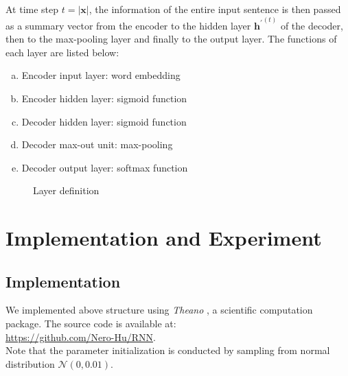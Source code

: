 \documentclass[11pt,letterpaper]{article}
\begin{document}
At time step $t = |\mathbf{x}|$, the information of the entire input sentence is then passed as a summary vector from the encoder to the hidden layer ${\mathbf{h}^\prime}^{(t)}$ of the decoder, then to the max-pooling layer and finally to the output layer.
The functions of each layer are listed below:
\begin{enumerate}[a.]
\item Encoder input layer: word embedding
\item Encoder hidden layer: sigmoid function
\item Decoder hidden layer: sigmoid function
\item Decoder max-out unit: max-pooling
\item Decoder output layer: softmax function
\end{enumerate}

\begin{figure}[H]
	\begin{center}
	\end{center}
	\caption{Layer definition}
\end{figure}

\section{Implementation and Experiment}
\subsection{Implementation} %
\label{sub:theano}
We implemented above structure using \textit{Theano} \cite{theano}, a scientific computation package. The source code is available at:\\
\url{https://github.com/Nero-Hu/RNN}.\\
Note that the parameter initialization is conducted by sampling from normal distribution $\mathcal{N}(0,0.01)$.
\end{document}
